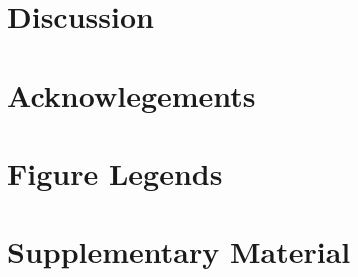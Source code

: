 \section{Discussion}


\section{Acknowlegements}



{\footnotesize


}


\pagebreak
\FloatBarrier
\section{Figure Legends}


\pagebreak
\FloatBarrier

\beginsupplement
\setcounter{secnumdepth}{4}
\section{Supplementary Material}


\pagebreak


\pagebreak

% 

\pagebreak


% 
% 




